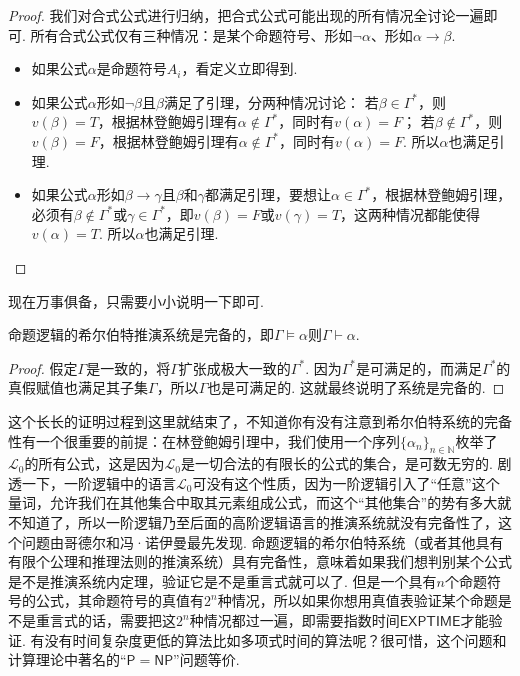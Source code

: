 \documentclass[main.tex]{subfiles}
\begin{document}
\begin{proof}
    我们对合式公式进行归纳，把合式公式可能出现的所有情况全讨论一遍即可. 所有合式公式仅有三种情况：是某个命题符号、形如\(\neg \alpha\)、形如\(\alpha \to \beta\).
    \begin{itemize}
        \item 如果公式\(\alpha\)是命题符号\(A_i\)，看定义立即得到. 
        \item 如果公式\(\alpha\)形如\(\neg \beta\)且\(\beta\)满足了引理，分两种情况讨论：\newline
        若\(\beta \in \Gamma^*\)，则\(v(\beta)=T\)，根据林登鲍姆引理有\(\alpha \not \in \Gamma^*\)，同时有\(v(\alpha) = F\)；\newline
        若\(\beta \not \in \Gamma^*\)，则\(v(\beta)=F\)，根据林登鲍姆引理有\(\alpha \not \in \Gamma^*\)，同时有\(v(\alpha) = F\). \newline
        所以\(\alpha\)也满足引理. 
        \item 如果公式\(\alpha\)形如\(\beta \to \gamma\)且\(\beta\)和\(\gamma\)都满足引理，要想让\(\alpha \in \Gamma^*\)，根据林登鲍姆引理，必须有\(\beta \not \in \Gamma^*\)或\(\gamma \in \Gamma^*\)，即\(v(\beta)=F\)或\(v(\gamma)=T\)，这两种情况都能使得\(v(\alpha)=T\). 所以\(\alpha\)也满足引理.
    \end{itemize}
\end{proof}

现在万事俱备，只需要小小说明一下即可.

\begin{theorem}{}
    命题逻辑的希尔伯特推演系统是完备的，即\(\Gamma \vDash \alpha\)则\(\Gamma \vdash \alpha\).
\end{theorem}

\begin{proof}
    假定\(\Gamma\)是一致的，将\(\Gamma\)扩张成极大一致的\(\Gamma^*\). 因为\(\Gamma^*\)是可满足的，而满足\(\Gamma^*\)的真假赋值也满足其子集\(\Gamma\)，所以\(\Gamma\)也是可满足的. 这就最终说明了系统是完备的.
\end{proof}

这个长长的证明过程到这里就结束了，不知道你有没有注意到希尔伯特系统的完备性有一个很重要的前提：在林登鲍姆引理中，我们使用一个序列\(\{\alpha_n\}_{n \in \mathbb{N}}\)枚举了\(\mathcal{L}_0\)的所有公式，这是因为\(\mathcal{L}_0\)是一切合法的有限长的公式的集合，是可数无穷的. 剧透一下，一阶逻辑中的语言\(\mathcal{L}_0\)可没有这个性质，因为一阶逻辑引入了“任意”这个量词，允许我们在其他集合中取其元素组成公式，而这个“其他集合”的势有多大就不知道了，所以一阶逻辑乃至后面的高阶逻辑语言的推演系统就没有完备性了，这个问题由哥德尔和冯·诺伊曼最先发现. 命题逻辑的希尔伯特系统（或者其他具有有限个公理和推理法则的推演系统）具有完备性，意味着如果我们想判别某个公式是不是推演系统内定理，验证它是不是重言式就可以了. 但是一个具有\(n\)个命题符号的公式，其命题符号的真值有\(2^n\)种情况，所以如果你想用真值表验证某个命题是不是重言式的话，需要把这\(2^n\)种情况都过一遍，即需要指数时间\(\mathsf{EXPTIME}\)才能验证. 有没有时间复杂度更低的算法比如多项式时间的算法呢？很可惜，这个问题和计算理论中著名的“\(\mathsf{P} = \mathsf{NP}\)”问题等价. 
\end{document}
